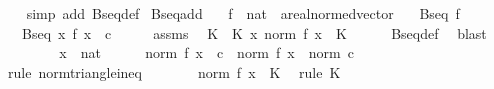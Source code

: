 \begin{isabellebody}
%
\isadelimproof
\ \ %
\endisadelimproof
%
\isatagproof
{}\isamarkupfalse%
\ {\isacharparenleft}{\kern0pt}simp\ add{\isacharcolon}{\kern0pt}\ Bseq{\isacharunderscore}{\kern0pt}def{\isacharparenright}{\kern0pt}%
\endisatagproof
{\isafoldproof}%
%
\isadelimproof
\isanewline
%
\endisadelimproof
\isanewline
{}\isamarkupfalse%
\ Bseq{\isacharunderscore}{\kern0pt}add{\isacharcolon}{\kern0pt}\isanewline
\ \ \ f\ {\isacharcolon}{\kern0pt}{\isacharcolon}{\kern0pt}\ {\isachardoublequoteopen}nat\ {\isasymRightarrow}\ {\isacharprime}{\kern0pt}a{\isacharcolon}{\kern0pt}{\isacharcolon}{\kern0pt}real{\isacharunderscore}{\kern0pt}normed{\isacharunderscore}{\kern0pt}vector{\isachardoublequoteclose}\isanewline
\ \ \ {\isachardoublequoteopen}Bseq\ f{\isachardoublequoteclose}\isanewline
\ \ \ {\isachardoublequoteopen}Bseq\ {\isacharparenleft}{\kern0pt}{\isasymlambda}x{\isachardot}{\kern0pt}\ f\ x\ {\isacharplus}{\kern0pt}\ c{\isacharparenright}{\kern0pt}{\isachardoublequoteclose}\isanewline
%
\isadelimproof
%
\endisadelimproof
%
\isatagproof
{}\isamarkupfalse%
\ {\isacharminus}{\kern0pt}\isanewline
\ \ \isamarkupfalse%
\ assms\ \isamarkupfalse%
\ K\ \ K{\isacharcolon}{\kern0pt}\ {\isachardoublequoteopen}{\isasymAnd}x{\isachardot}{\kern0pt}\ norm\ {\isacharparenleft}{\kern0pt}f\ x{\isacharparenright}{\kern0pt}\ {\isasymle}\ K{\isachardoublequoteclose}\isanewline
\ \ \ \ \isamarkupfalse%
\ Bseq{\isacharunderscore}{\kern0pt}def\ \isamarkupfalse%
\ blast\isanewline
\ \ \isacommand{{\isacharbraceleft}{\kern0pt}}\isamarkupfalse%
\isanewline
\ \ \ \ \isamarkupfalse%
\ x\ {\isacharcolon}{\kern0pt}{\isacharcolon}{\kern0pt}\ nat\isanewline
\ \ \ \ \isamarkupfalse%
\ {\isachardoublequoteopen}norm\ {\isacharparenleft}{\kern0pt}f\ x\ {\isacharplus}{\kern0pt}\ c{\isacharparenright}{\kern0pt}\ {\isasymle}\ norm\ {\isacharparenleft}{\kern0pt}f\ x{\isacharparenright}{\kern0pt}\ {\isacharplus}{\kern0pt}\ norm\ c{\isachardoublequoteclose}\ \isamarkupfalse%
\ {\isacharparenleft}{\kern0pt}rule\ norm{\isacharunderscore}{\kern0pt}triangle{\isacharunderscore}{\kern0pt}ineq{\isacharparenright}{\kern0pt}\isanewline
\ \ \ \ \isamarkupfalse%
\ \isamarkupfalse%
\ {\isachardoublequoteopen}norm\ {\isacharparenleft}{\kern0pt}f\ x{\isacharparenright}{\kern0pt}\ {\isasymle}\ K{\isachardoublequoteclose}\ \isamarkupfalse%
\ {\isacharparenleft}{\kern0pt}rule\ K{\isacharparenright}{\kern0pt}\isanewline

\end{isabellebody}
